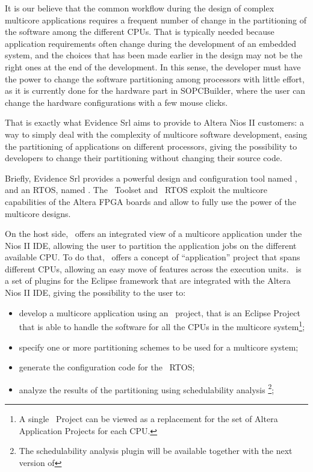 It is our believe that the common workflow during the design of
complex multicore applications requires a frequent number of change in
the partitioning of the software among the different CPUs. That is
typically needed because application requirements often change during
the development of an embedded system, and the choices that has been
made earlier in the design may not be the right ones at the end of the
development. In this sense, the developer must have the power to
change the software partitioning among processors with little effort,
as it is currently done for the hardware part in SOPCBuilder, where
the user can change the hardware configurations with a few mouse
clicks.

That is exactly what Evidence Srl aims to provide to Altera Nios II
customers: a way to simply deal with the complexity of multicore
software development, easing the partitioning of applications on
different processors, giving the possibility to developers to change
their partitioning without changing their source code.

Briefly, Evidence Srl provides a powerful design and configuration
tool named \rtd, and an RTOS, named \ee. The \rtd\ Toolset and \ee\
RTOS exploit the multicore capabilities of the Altera FPGA boards and
allow to fully use the power of the multicore designs.

On the host side, \rtd\ offers an integrated view of a multicore
application under the Nios II IDE, allowing the user to partition the
application jobs on the different available CPU. To do that, \rtd\
offers a concept of ``application'' project that spans different CPUs,
allowing an easy move of features across the execution units. \rtd\ is
a set of plugins for the Eclipse framework that are integrated with
the Altera Nios II IDE, giving the possibility to the user to:
\begin{itemize}
\item develop a multicore application using an \rtd\ project, that is
      an Eclipse Project that is able to handle the software for all
      the CPUs in the multicore system\footnote{A single \rtd\ Project
      can be viewed as a replacement for the set of Altera Application
      Projects for each CPU.};
\item specify one or more partitioning schemes to be used for a
      multicore system;
\item generate the configuration code for the \ee\ RTOS;
\item analyze the results of the partitioning using schedulability
      analysis \footnote{The schedulability analysis plugin will be
      available together with the next version of \rtd};
\end{itemize}



